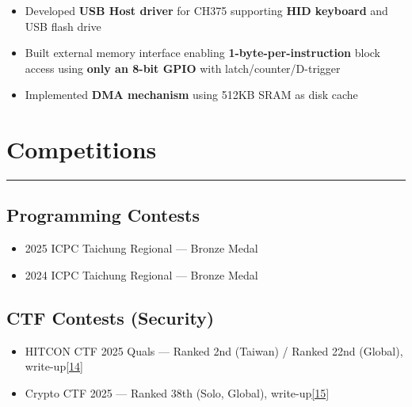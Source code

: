 \documentclass[11pt]{article}
\begin{document}
\begin{itemize}
  \item Developed \textbf{USB Host driver} for CH375 supporting \textbf{HID keyboard} and USB flash drive
  \item Built external memory interface enabling \textbf{1-byte-per-instruction} block access using \textbf{only an 8-bit GPIO} with latch/counter/D-trigger
  \item Implemented \textbf{DMA mechanism} using 512KB SRAM as disk cache
\end{itemize}

\section*{Competitions}
\vspace{-9pt}\noindent\rule{\linewidth}{0.6pt}\vspace{-1pt}
\subsection*{Programming Contests}
\begin{itemize}
  \item 2025 ICPC Taichung Regional --- Bronze Medal
  \item 2024 ICPC Taichung Regional --- Bronze Medal
\end{itemize}

\subsection*{CTF Contests (Security)}
\begin{itemize}
  \item HITCON CTF 2025 Quals --- Ranked 2nd (Taiwan) / Ranked 22nd (Global), write-up\hyperlink{l14}{[14]}
  \item Crypto CTF 2025 --- Ranked 38th (Solo, Global), write-up\hyperlink{l15}{[15]}
\end{itemize}
\end{document}
